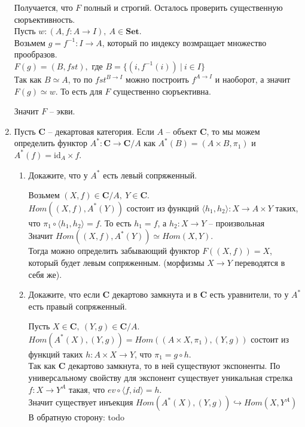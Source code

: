 \documentclass[draft]{article}
\newcommand{\cat}[1]{\mathbf{#1}}
\renewcommand{\C}{\cat{C}}
\newcommand{\Set}{\cat{Set}}
\newcommand{\fs}[1]{\mathrm{#1}}
\newcommand{\id}{\fs{id}}
\begin{document}
\begin{enumerate}
Получается, что $F$ полный и строгий. Осталось проверить существенную сюръективность.\\

Пусть $w : (A, f: A \to I), ~A\in \Set$. \\
Возьмем $g = f^{-1} : I \to A$, который по индексу возмращает множество прообразов.\\

$F(g) = (B, fst),$ где $B = \{ (i, f^{-1}(i)) ~|~ i\in I\}$\\
Так как $B \simeq A$, то по $fst^{B \to I}$ можно построить $f^{A \to I}$ и наоборот, а значит $F(g) \simeq w$. То есть для $F$ существенно сюръективна. 

Значит $F$ -- экви.

\item Пусть $\C$ -- декартовая категория.
Если $A$ -- объект $\C$, то мы можем определить функтор $A^* : \C \to \C/A$ как $A^*(B) = (A \times B, \pi_1)$ и $A^*(f) = \id_A \times f$.
\begin{enumerate}
\item Докажите, что у $A^*$ есть левый сопряженный.

Возьмем  $(X, f) \in \C/A,~Y \in \C$.\\
$Hom((X, f), A^*(Y))$ состоит из функций $\langle h_1, h_2\rangle : X \to A \times Y$ таких, что $\pi_1 \circ \langle h_1, h_2\rangle = f$. То есть $h_1 = f$, а $h_2 : X \to Y$ -- произвольная\\
Значит $Hom((X, f), A^*(Y)) \simeq Hom(X, Y)$. \\
Тогда можно определить забывающий функтор $F((X, f)) = X$, который будет левым сопряженным. (морфизмы $X \to Y$ переводятся в себя же).

\item Докажите, что если $\C$ декартово замкнута и в $\C$ есть уравнители, то у $A^*$ есть правый сопряженный.

Пусть $X \in \C,~(Y, g) \in \C/A$. \\
$Hom(A^*(X), (Y, g)) = Hom((A \times X, \pi_1), (Y, g))$ состоит из функций таких $h: A \times X \to Y$, что $\pi_1 = g \circ h$.\\
Так как $\C$ декартово замкнута, то в ней существуют экспоненты. По универсальному свойству для экспонент существует уникальная стрелка $f: X \to Y^A$ такая, что $ev \circ \langle f, id\rangle = h$.\\
Значит существует инъекция $Hom(A^*(X), (Y, g)) \hookrightarrow Hom(X, Y^A)$\\

В обратную сторону: todo

\end{enumerate}
\end{enumerate}
\end{document}
